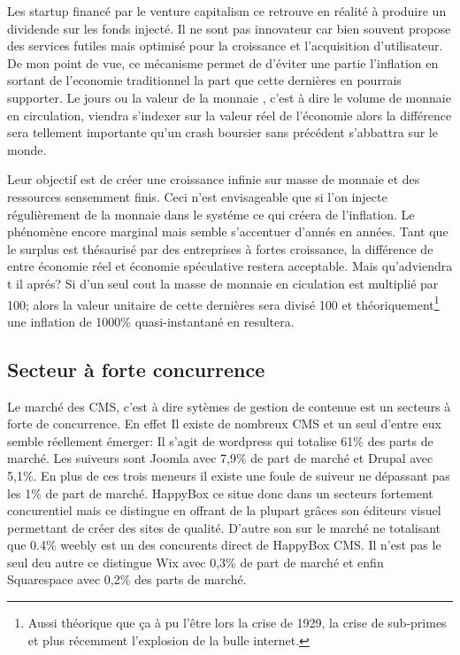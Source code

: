 \documentclass[11pt, a4paper ]{article}
\begin{document}
\begin{spacing}{1.5}
Les startup financé par le venture capitalism ce retrouve en réalité à produire un dividende sur les fonds injecté. Il ne sont pas innovateur car bien souvent propose des services futiles mais optimisé pour la croissance et l'acquisition d'utilisateur.
De mon point de vue, ce mécanisme permet de d'éviter une partie l'inflation en sortant de l'economie traditionnel la part que cette dernières en pourrais supporter. Le jours ou la valeur de la monnaie , c'est à dire le volume de monnaie en circulation, viendra s'indexer sur la valeur réel de l'économie alors la différence sera tellement importante qu'un crash boursier sans précédent s'abbattra sur le monde.

Leur objectif est de créer une croissance infinie sur masse de monnaie et des ressources sensemment finis. Ceci n'est envisageable que si l'on injecte régulièrement de la monnaie dans le systéme ce qui créera de l'inflation. Le phénomène encore marginal mais semble s'accentuer d'annés en années. Tant que le surplus est thésaurisé par des entreprises à fortes croissance, la différence de entre économie réel et économie spéculative restera acceptable.
Mais qu'adviendra t il aprés? Si d'un seul cout la masse de monnaie en ciculation est multiplié par 100; alors la valeur unitaire de cette dernières sera divisé 100 et théoriquement\footnote{Aussi théorique que ça à pu l'être lors la crise de 1929, la crise de sub-primes et plus récemment l'explosion de la bulle internet.} une inflation de 1000\% quasi-instantané en resultera.




\subsection{Secteur à forte concurrence}
Le marché des CMS, c'est à dire sytèmes de gestion de contenue est un secteurs à forte de concurrence. En effet Il existe de nombreux CMS et un seul d'entre eux semble réellement émerger: Il s'agit de wordpress qui totalise 61\% des parts de marché\cite{cms}. Les suiveurs sont Joomla avec 7,9\% de part de marché et Drupal avec 5,1\%.
En plus de ces trois meneurs il existe une foule de suiveur ne dépassant pas les 1\% de part de marché.
HappyBox ce situe donc dans un secteurs fortement concurentiel mais ce distingue en offrant de la plupart grâces son éditeurs visuel permettant de créer des sites de qualité. D'autre son sur le marché ne totalisant que 0.4\% weebly est un des concurents direct de HappyBox CMS. Il n'est pas le seul deu autre ce distingue Wix avec 0,3\% de part de marché et enfin Squarespace avec 0,2\% des parts de marché.


\end{spacing}
\end{document}
